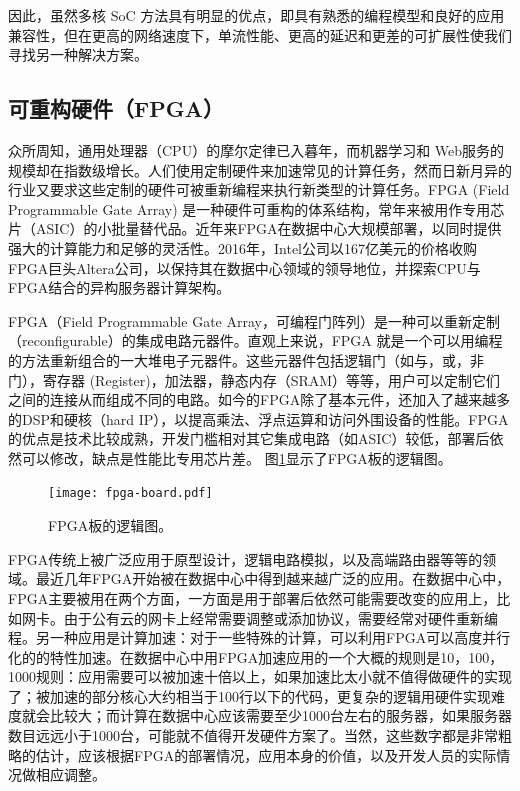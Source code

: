 因此，虽然多核 SoC 方法具有明显的优点，即具有熟悉的编程模型和良好的应用兼容性，但在更高的网络速度下，单流性能、更高的延迟和更差的可扩展性使我们寻找另一种解决方案。


\subsection{可重构硬件（FPGA）}
\label{smartnic-fpga}

众所周知，通用处理器（CPU）的摩尔定律已入暮年，而机器学习和 Web服务的规模却在指数级增长。人们使用定制硬件来加速常见的计算任务，然而日新月异的行业又要求这些定制的硬件可被重新编程来执行新类型的计算任务。FPGA (Field Programmable Gate Array) 是一种硬件可重构的体系结构，常年来被用作专用芯片（ASIC）的小批量替代品。近年来FPGA在数据中心大规模部署，以同时提供强大的计算能力和足够的灵活性。2016年，Intel公司以167亿美元的价格收购FPGA巨头Altera公司，以保持其在数据中心领域的领导地位，并探索CPU与FPGA结合的异构服务器计算架构。


FPGA（Field Programmable Gate Array，可编程门阵列）是一种可以重新定制（reconfigurable）的集成电路元器件。直观上来说，FPGA 就是一个可以用编程的方法重新组合的一大堆电子元器件。这些元器件包括逻辑门（如与，或，非门），寄存器 (Register)，加法器，静态内存（SRAM）等等，用户可以定制它们之间的连接从而组成不同的电路。如今的FPGA除了基本元件，还加入了越来越多的DSP和硬核（hard IP），以提高乘法、浮点运算和访问外围设备的性能。FPGA的优点是技术比较成熟，开发门槛相对其它集成电路（如ASIC）较低，部署后依然可以修改，缺点是性能比专用芯片差。
图\ref{clicknp:fig:fpga}显示了FPGA板的逻辑图。


\begin{figure}[t]
	\centering
	\texttt{[image: fpga-board.pdf]}
	
	\caption{FPGA板的逻辑图。}
	\label{clicknp:fig:fpga}
	
\end{figure}


FPGA传统上被广泛应用于原型设计，逻辑电路模拟，以及高端路由器等等的领域。最近几年FPGA开始被在数据中心中得到越来越广泛的应用。在数据中心中，FPGA主要被用在两个方面，一方面是用于部署后依然可能需要改变的应用上，比如网卡。由于公有云的网卡上经常需要调整或添加协议，需要经常对硬件重新编程。另一种应用是计算加速：对于一些特殊的计算，可以利用FPGA可以高度并行化的的特性加速。在数据中心中用FPGA加速应用的一个大概的规则是10，100，1000规则：应用需要可以被加速十倍以上，如果加速比太小就不值得做硬件的实现了；被加速的部分核心大约相当于100行以下的代码，更复杂的逻辑用硬件实现难度就会比较大；而计算在数据中心应该需要至少1000台左右的服务器，如果服务器数目远远小于1000台，可能就不值得开发硬件方案了。当然，这些数字都是非常粗略的估计，应该根据FPGA的部署情况，应用本身的价值，以及开发人员的实际情况做相应调整。


